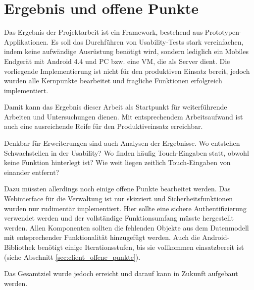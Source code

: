 \section{Ergebnis und offene Punkte}

Das Ergebnis der Projektarbeit ist ein Framework, bestehend aus Prototypen-Applikationen.
Es soll das Durchführen von Usability-Tests stark vereinfachen, indem keine aufwändige Ausrüstung benötigt wird, sondern lediglich ein Mobiles Endgerät mit Android 4.4 und PC bzw. eine \ac{VM}, die als Server dient.
Die vorliegende Implementierung ist nicht für den produktiven Einsatz bereit, jedoch wurden alle Kernpunkte bearbeitet und fragliche Funktionen erfolgreich implementiert.

Damit kann das Ergebnis dieser Arbeit als Startpunkt für weiterführende Arbeiten und Untersuchungen dienen.
Mit entsprechendem Arbeitsaufwand ist auch eine ausreichende Reife für den Produktiveinsatz erreichbar.

Denkbar für Erweiterungen sind auch Analysen der Ergebnisse. Wo entstehen Schwachstellen in der Usability? Wo finden häufig Touch-Eingaben statt, obwohl keine Funktion hinterlegt ist? Wie weit liegen zeitlich Touch-Eingaben von einander entfernt?

Dazu müssten allerdings noch einige offene Punkte bearbeitet werden.
Das Webinterface für die Verwaltung ist nur skizziert und Sicherheitsfunktionen wurden nur rudimentär implementiert. 
Hier sollte eine sichere Authentifizierung verwendet werden und der vollständige Funktionsumfang müsste hergestellt werden.
Allen Komponenten sollten die fehlenden Objekte aus dem Datenmodell mit entsprechender Funktionalität hinzugefügt werden.
Auch die Android-Bibliothek benötigt einige Iterationsstufen, bis sie vollkommen einsatzbereit ist (siehe Abschnitt \ref{sec:client_offene_punkte}).

Das Gesamtziel wurde jedoch erreicht und darauf kann in Zukunft aufgebaut werden.